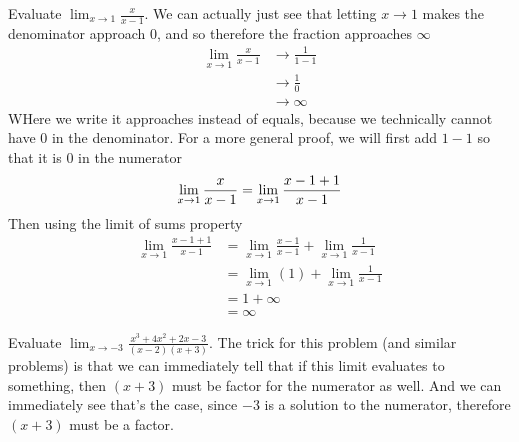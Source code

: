 \documentclass[working]{tuftebook}
\begin{document}
\begin{fullwidth}
\begin{eg}
    Evaluate $\displaystyle \lim_{x\to 1} \frac{x}{x-1}$. We can actually just see that letting $x\to1$ makes the denominator approach $0$, and so therefore the fraction approaches $ \infty $
    \begin{align*}
        \lim_{x\to 1} \frac{x}{x-1}&\to \frac{1}{1-1}\\ 
                                   &\to \frac{1}{0}\\ 
                                   &\to \infty 
    \end{align*}
    WHere we write it approaches instead of equals, because we technically cannot have 0 in the denominator. For a more general proof, we will first add $1-1$ so that it is 0 in the numerator 
    \[
        \lim_{x\to 1} \frac{x}{x-1}= \lim_{x\to 1} \frac{x-1+1}{x-1}\\
    \]
    Then using the limit of sums property 
    \begin{align*}
        \lim_{x\to 1} \frac{x-1+1}{x-1}&= \lim_{x\to 1} \frac{x-1}{x-1}+ \lim_{x\to 1} \frac{1}{x-1}\\ 
                                       &= \lim_{x\to 1}(1)+ \lim_{x\to 1} \frac{1}{x-1}\\ 
                                       &=1+ \infty \\ 
                                       &= \infty 
    \end{align*}
\end{eg}
\end{fullwidth}
\begin{eg}
    Evaluate $\displaystyle \lim_{x\to -3} \frac{x^3+4x^2+2x-3}{(x-2)(x+3)}$. The trick for this problem (and similar problems) is that we can immediately tell that if this limit evaluates to something, then $(x+3)$ must be factor for the numerator as well. And we can immediately see that's the case, since $-3$ is a solution to the numerator, therefore $(x+3)$ must be a factor. 
\end{eg}
\newpage
\end{document}
